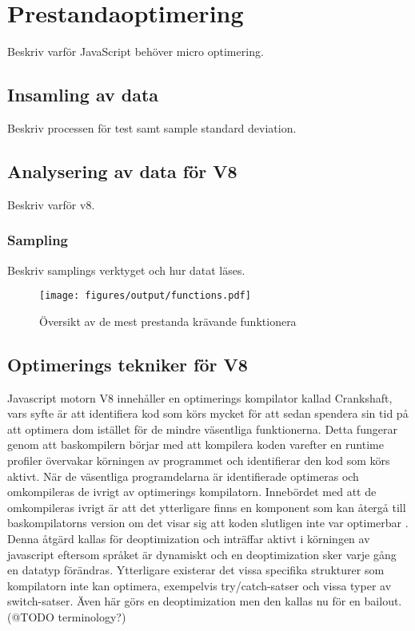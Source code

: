 \section{Prestandaoptimering}

Beskriv varför JavaScript behöver micro optimering.

\subsection{Insamling av data}

Beskriv processen för test samt sample standard deviation.

\subsection{Analysering av data för V8}

Beskriv varför v8.

\subsubsection{Sampling}

Beskriv samplings verktyget och hur datat läses.

\begin{figure}[ht]
  \texttt{[image: figures/output/functions.pdf]}
  \caption{Översikt av de mest prestanda krävande funktionera}
\end{figure}

\subsection{Optimerings tekniker för V8}

Javascript motorn V8 innehåller en optimerings kompilator kallad Crankshaft,
vars syfte är att identifiera kod som körs mycket för att sedan spendera sin
tid på att optimera dom istället för de mindre väsentliga funktionerna. Detta
fungerar genom att baskompilern börjar med att kompilera koden varefter en
runtime profiler övervakar körningen av programmet och identifierar den kod
som körs aktivt. När de väsentliga programdelarna är identifierade
optimeras och omkompileras de ivrigt av optimerings kompilatorn. Innebördet
med att de omkompileras ivrigt är att det ytterligare finns en komponent som
kan återgå till baskompilatorns version om det visar sig att koden slutligen
inte var optimerbar \citep{mk10}. Denna åtgärd kallas för deoptimization och
inträffar aktivt i körningen av javascript eftersom språket är dynamiskt och
en deoptimization sker varje gång en datatyp förändras. Ytterligare existerar
det vissa specifika strukturer som kompilatorn inte kan optimera, exempelvis
try/catch-satser och vissa typer av switch-satser. Även här görs en
deoptimization men den kallas nu för en bailout. (@TODO terminology?)

